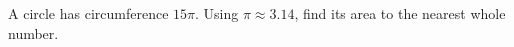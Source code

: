 A circle has circumference $15\pi$. Using $\pi\approx3.14$, find its area to the nearest whole number.
